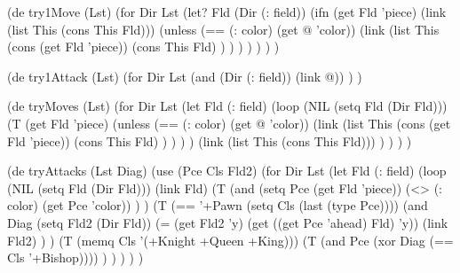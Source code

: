 \begin{wideverbatim}

 
(de try1Move (Lst)
   (for Dir Lst
      (let? Fld (Dir (: field))
         (ifn (get Fld 'piece)
            (link (list This (cons This Fld)))
            (unless (== (: color) (get @ 'color))
               (link
                  (list This
                     (cons (get Fld 'piece))
                     (cons This Fld) ) ) ) ) ) ) )
 
(de try1Attack (Lst)
   (for Dir Lst
      (and (Dir (: field)) (link @)) )  )
 
(de tryMoves (Lst)
   (for Dir Lst
      (let Fld (: field)
         (loop
            (NIL (setq Fld (Dir Fld)))
            (T (get Fld 'piece)
               (unless (== (: color) (get @ 'color))
                  (link
                     (list This
                        (cons (get Fld 'piece))
                        (cons This Fld) ) ) ) )
            (link (list This (cons This Fld))) ) ) ) )
 
(de tryAttacks (Lst Diag)
   (use (Pce Cls Fld2)
      (for Dir Lst
         (let Fld (: field)
            (loop
               (NIL (setq Fld (Dir Fld)))
               (link Fld)
               (T
                  (and
                     (setq Pce (get Fld 'piece))
                     (<> (: color) (get Pce 'color)) ) )
               (T (== '+Pawn (setq Cls (last (type Pce))))
                  (and
                     Diag
                     (setq Fld2 (Dir Fld))
                     (= (get Fld2 'y) (get ((get Pce 'ahead) Fld) 'y))
                     (link Fld2) ) )
               (T (memq Cls '(+Knight +Queen +King)))
               (T (and Pce (xor Diag (== Cls '+Bishop)))) ) ) ) ) )



\end{wideverbatim}


